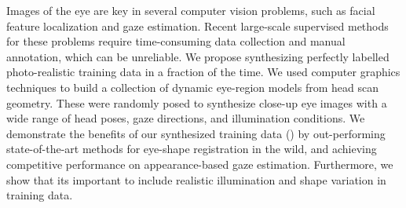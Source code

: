 Images of the eye are key in several computer vision problems, such as facial feature localization and gaze estimation.
Recent large-scale supervised methods for these problems require time-consuming data collection and manual annotation, which can be unreliable.
We propose synthesizing perfectly labelled photo-realistic training data in a fraction of the time.
We used computer graphics techniques to build a collection of dynamic eye-region models from head scan geometry.
%
These were randomly posed to synthesize close-up eye images with a wide range of head poses, gaze directions, and illumination conditions.
%
We demonstrate the benefits of our synthesized training data (\dataset) by out-performing state-of-the-art methods for eye-shape registration in the wild, and achieving competitive performance on appearance-based gaze estimation.
Furthermore, we show that its important to include realistic illumination and shape variation in training data.